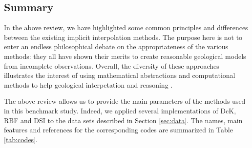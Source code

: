 \documentclass[preprint]{ring20}
\begin{document}

\subsection{Summary}

In the above review, we have highlighted some common principles and differences between the existing implicit interpolation methods. The purpose here is not to enter an endless philosophical debate on the appropriateness of the various methods: they all have shown their merits to create reasonable geological models from incomplete observations. Overall, the diversity of these approaches illustrates the interest of using mathematical abstractions and computational methods to help geological interpetation and reasoning \citep{frodeman_geological_1995}. %

The above review allows us to provide the main parameters of the methods used in this benchmark study. Indeed, we applied several implementations of DcK, RBF and DSI to the data sets described in Section \ref{sec:data}. The names, main features and references 
for the corresponding codes are summarized in Table \ref{tab:codes}. 
\end{document}

